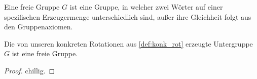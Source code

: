 \begin{definition}\label{def:freie_grp}
Eine freie Gruppe $G$ ist eine Gruppe, in welcher zwei Wörter auf einer spezifischen Erzeugermenge unterschiedlich 
sind, außer ihre Gleichheit folgt aus den Gruppenaxiomen.
\leanok
\end{definition}

\begin{theorem}\label{thm:freie_grp_an_rot}
Die von unseren konkreten Rotationen aus \ref{def:konk_rot} erzeugte Untergruppe $G$ ist eine freie Gruppe.
 \leanok
\end{theorem}
\begin{proof}
chillig.
\end{proof}


